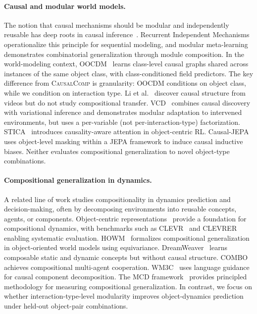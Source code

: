 \documentclass{article}
\newcommand{\ours}{\textsc{CausalComp}}
\begin{document}

\paragraph{Causal and modular world models.}
The notion that causal mechanisms should be modular and independently reusable has deep roots in causal inference~\citep{pearl2009causality,scholkopf2021causal,bengio2020machine}. Recurrent Independent Mechanisms~\citep{goyal2021recurrent} operationalize this principle for sequential modeling, and modular meta-learning~\citep{alet2019modular} demonstrates combinatorial generalization through module composition. In the world-modeling context, OOCDM~\citep{oocdm2024} learns class-level causal graphs shared across instances of the same object class, with class-conditioned field predictors. The key difference from \ours{} is granularity: OOCDM conditions on object class, while we condition on interaction type. Li et al.~\citep{li2020causal} discover causal structure from videos but do not study compositional transfer. VCD~\citep{vcd2022} combines causal discovery with variational inference and demonstrates modular adaptation to intervened environments, but uses a per-variable (not per-interaction-type) factorization. STICA~\citep{stica2026} introduces causality-aware attention in object-centric RL. Causal-JEPA~\citep{causaljepa2026} uses object-level masking within a JEPA framework to induce causal inductive biases. Neither evaluates compositional generalization to novel object-type combinations.

\paragraph{Compositional generalization in dynamics.}
A related line of work studies compositionality in dynamics prediction and decision-making, often by decomposing environments into reusable concepts, agents, or components.
Object-centric representations~\citep{greff2019multi,locatello2020slotattention} provide a foundation for compositional dynamics, with benchmarks such as CLEVR~\citep{johnson2017clevr} and CLEVRER~\citep{yi2020clevrer} enabling systematic evaluation. HOWM~\citep{zhao2022toward} formalizes compositional generalization in object-oriented world models using equivariance. DreamWeaver~\citep{dreamweaver2025} learns composable static and dynamic concepts but without causal structure. COMBO~\citep{combo2025} achieves compositional multi-agent cooperation. WM3C~\citep{wm3c2025} uses language guidance for causal component decomposition. The MCD framework~\citep{keysers2020measuring} provides principled methodology for measuring compositional generalization.
In contrast, we focus on whether interaction-type-level modularity improves object-dynamics prediction under held-out object-pair combinations.
\end{document}

